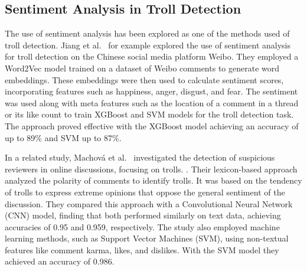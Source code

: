 \documentclass[twoside]{ctuthesis}
\theoremstyle{plain}
\theoremstyle{definition}
\theoremstyle{note}
\begin{document}
\subsection{Sentiment Analysis in Troll Detection}
The use of sentiment analysis has been explored as one of the methods used of troll detection. Jiang et al.~\cite{Jiang2021Sentiment} for example explored the use of sentiment analysis for troll detection on the Chinese social media platform Weibo.  They employed a Word2Vec model trained on a dataset of Weibo comments to generate word embeddings. These embeddings were then used to calculate sentiment scores, incorporating features such as happiness, anger, disgust, and fear. The sentiment was used along with meta features such as the location of a comment in a thread or its like count to train XGBoost and SVM models for the troll detection task. The approach proved effective with the XGBoost model achieving an accuracy of up to 89\% and SVM up to 87\%.\par
In a related study, Machová et al.~\cite{Machova2022Comparison} investigated the detection of suspicious reviewers in online discussions, focusing on trolls. . Their lexicon-based approach analyzed the polarity of comments to identify trolls. It was based on the tendency of trolls to express extreme opinions that oppose the general sentiment of the discussion. They compared this approach with a Convolutional Neural Network (CNN) model, finding that both performed similarly on text data, achieving accuracies of 0.95 and 0.959, respectively.  The study also employed machine learning methods, such as Support Vector Machines (SVM), using non-textual features like comment karma, likes, and dislikes. With the SVM model they achieved an accuracy of 0.986.

\end{document}
